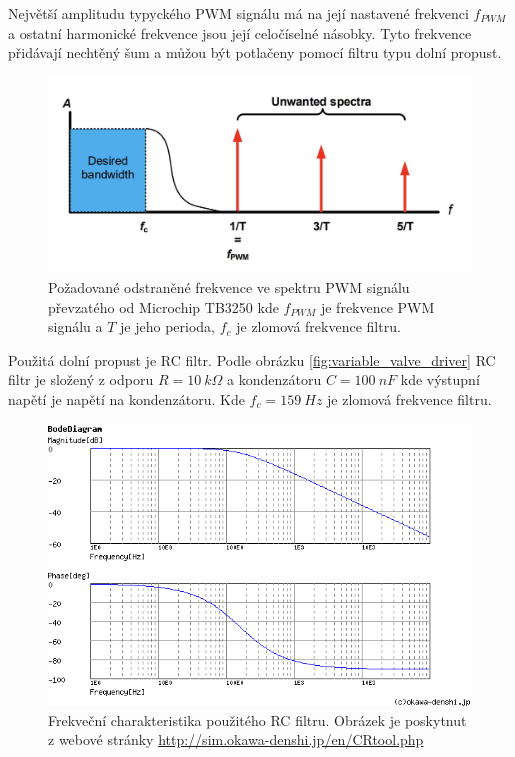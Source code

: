 Největší amplitudu typyckého PWM signálu má na její nastavené frekvenci $f_{PWM}$ a ostatní harmonické frekvence jsou její celočíselné násobky. Tyto frekvence přidávají nechtěný šum a můžou být potlačeny pomocí filtru typu dolní propust.


\begin{figure}[H]
    \centering
    \includegraphics[width=1\linewidth]{pictures/rc_pwm_spectrum_microchip90003250A.jpg}
    \caption{Požadované odstraněné frekvence ve spektru PWM signálu převzatého od Microchip TB3250 kde $f_{PWM}$ je frekvence PWM signálu a $T$ je jeho perioda, $f_{c}$ je zlomová frekvence filtru.}
    \label{fig:unwanted_pwm_spectrum}
\end{figure}

Použitá dolní propust je RC filtr. Podle obrázku \ref{fig:variable_valve_driver} RC filtr je složený z odporu $R = 10 \ k\Omega$ a kondenzátoru $C = 100 \ nF$ kde výstupní napětí je napětí na kondenzátoru.
Kde $f_c = 159 \ Hz$ je zlomová frekvence filtru.

\begin{figure}[H]
    \centering
    \includegraphics[width=1\linewidth]{pictures/var_rc_filter.png}
    \caption{Frekveční charakteristika použitého RC filtru. Obrázek je poskytnut z webové stránky \url{http://sim.okawa-denshi.jp/en/CRtool.php}}
    \label{fig:var_rc_filter_char}
\end{figure}

